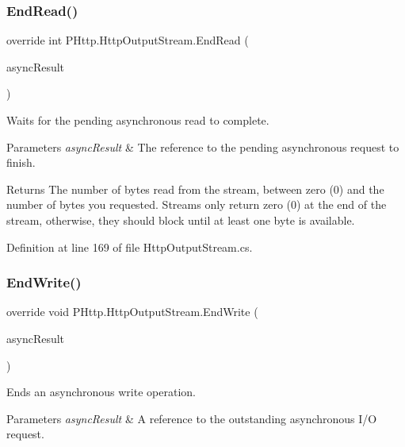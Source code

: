 \subsubsection{\texorpdfstring{End\+Read()}{EndRead()}}
{\footnotesize\ttfamily override int P\+Http.\+Http\+Output\+Stream.\+End\+Read (\begin{DoxyParamCaption}\item[{I\+Async\+Result}]{async\+Result }\end{DoxyParamCaption})}



Waits for the pending asynchronous read to complete. 


\begin{DoxyParams}{Parameters}
{\em async\+Result} & The reference to the pending asynchronous request to finish. \\
\hline
\end{DoxyParams}
\begin{DoxyReturn}{Returns}
The number of bytes read from the stream, between zero (0) and the number of bytes you requested. Streams only return zero (0) at the end of the stream, otherwise, they should block until at least one byte is available. 
\end{DoxyReturn}


Definition at line 169 of file Http\+Output\+Stream.\+cs.

\mbox{\label{class_p_http_1_1_http_output_stream_a1d31db11e5cf74a49016f88321961a59}} 
\subsubsection{\texorpdfstring{End\+Write()}{EndWrite()}}
{\footnotesize\ttfamily override void P\+Http.\+Http\+Output\+Stream.\+End\+Write (\begin{DoxyParamCaption}\item[{I\+Async\+Result}]{async\+Result }\end{DoxyParamCaption})}



Ends an asynchronous write operation. 


\begin{DoxyParams}{Parameters}
{\em async\+Result} & A reference to the outstanding asynchronous I/O request.\\
\hline
\end{DoxyParams}


